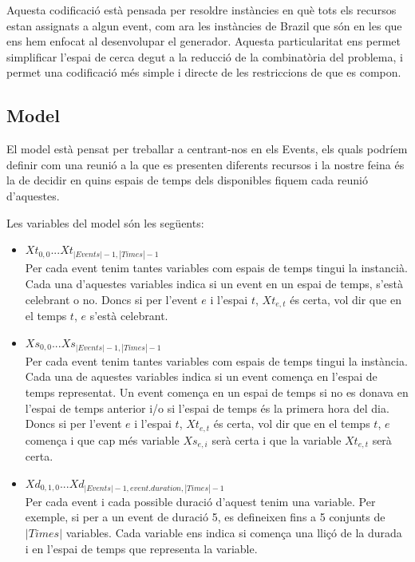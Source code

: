 \documentclass[11pt,a4paper,twoside]{report}
\begin{document}
  Aquesta codificació està pensada per resoldre instàncies en què tots els recursos estan assignats a algun event, com ara les instàncies de Brazil que són en les que ens hem enfocat al desenvolupar el generador. 
  Aquesta particularitat ens permet simplificar l'espai de cerca degut a la reducció de la combinatòria del problema, i permet una codificació més simple i directe de les restriccions de que es compon.

  \subsection{Model}

  El model està pensat per treballar a centrant-nos en els Events, els quals podríem definir com una reunió a la que es presenten diferents recursos i la nostre feina és la de decidir en quins espais de temps dels disponibles fiquem cada reunió d'aquestes.

  Les variables del model són les següents:
  \begin{itemize}
    \item $Xt_{0,0} . . . Xt_{|Events|-1,|Times|-1}$\\Per cada event tenim tantes variables com espais de temps tingui la instancià. Cada una d'aquestes variables indica si un event en un espai de temps, s'està celebrant o no. 
    Doncs si per l'event $e$ i l'espai $t$, $Xt_{e,t}$ és certa, vol dir que en el temps $t$, $e$ s'està celebrant.
    \item $Xs_{0,0} . . . Xs_{|Events|-1,|Times|-1}$\\Per cada event tenim tantes variables com espais de temps tingui la instància. Cada una de aquestes variables indica si un event comença en l'espai de temps representat. Un event comença en un espai de temps si no es donava en l'espai de temps anterior i/o si l'espai de temps és la primera hora del dia.
    Doncs si per l'event $e$ i l'espai $t$, $Xt_{e,t}$ és certa, vol dir que en el temps $t$, $e$ comença i que cap més variable $Xs_{e,i}$ serà certa i que la variable $Xt_{e,t}$ serà certa.
    \item $Xd_{0,1,0} . . . Xd_{|Events|-1, event.duration, |Times|-1}$\\ Per cada event i cada possible duració d'aquest tenim una variable. Per exemple, si per a un event de duració 5, es defineixen fins a 5 conjunts de $|Times|$ variables. 
    Cada variable ens indica si comença una lliçó de la durada i en l'espai de temps que representa la variable. 
  \end{itemize}
\end{document}
